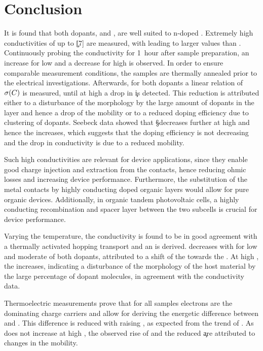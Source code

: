 \section{Conclusion}\label{sec:ResPdConclusion}
It is found that both dopants, \CrPd and \WPd, are well suited to n-doped \CS. Extremely high conductivities of up to \c[7] are measured, with \CrPd leading to larger values than \WPd. Continuously probing the conductivity for 1~hour after sample preparation, an increase for low and a decrease for high \CLongs is observed. In order to ensure comparable measurement conditions, the samples are thermally annealed prior to the electrical investigations. Afterwards, for both dopants a linear relation of $\c(\C)$ is measured, until at high \C a drop in \c is detected. This reduction is attributed either to a disturbance of the morphology by the large amount of dopants in the layer and hence a drop of the mobility or to a reduced doping efficiency due to clustering of dopants. Seebeck data showed that \S decreases further at high \C and hence the \neLong increases, which suggests that the doping efficiency is not decreasing and the drop in conductivity is due to a reduced mobility. 

Such high conductivities are relevant for device applications, since they enable good charge injection and extraction from the contacts, hence reducing ohmic losses and increasing device performance\cite{Blochwitz1998}.
Furthermore, the substitution of the metal contacts by highly conducting doped organic layers would allow for pure organic devices\cite{Schubert2013}. Additionally, in organic tandem photovoltaic cells, a highly conducting recombination and spacer layer between the two subcells is crucial for device performance\cite{Riede2011,Meiss2011}.

Varying the temperature, the conductivity is found to be in good agreement with a thermally activated hopping transport and an \EactLong \Eact is derived. \Eact decreases with \C for low and moderate \C of both dopants, attributed to a shift of the \EfLong towards the \EtLong. At high \C, the \Eact increases, indicating a disturbance of the morphology of the host material by the large percentage of dopant molecules, in agreement with the conductivity data.

Thermoelectric measurements prove that for all samples electrons are the dominating charge carriers and allow for deriving the energetic difference \Es between \EfLong and \EtLong. This difference is reduced with raising \CLong, as expected from the trend of \Eact. As \Es does not increase at high \C, the observed rise of \Eact and the reduced \c are attributed to changes in the mobility.

